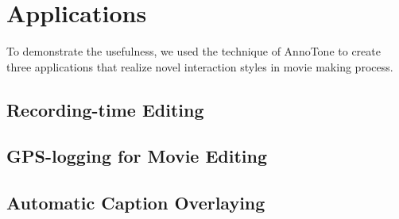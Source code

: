 \chapter{Applications}

To demonstrate the usefulness, we used the technique of AnnoTone to create three applications that realize novel interaction styles in movie making process.

\section{Recording-time Editing}


\section{GPS-logging for Movie Editing}


\section{Automatic Caption Overlaying}
